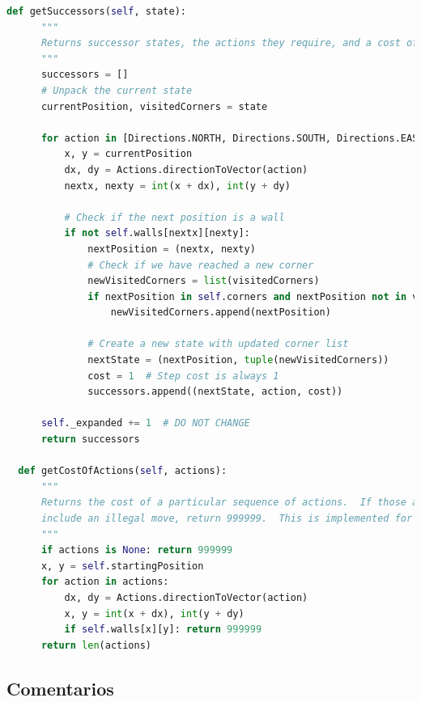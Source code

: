 \documentclass{report}
\begin{document}
\begin{lstlisting}[language=Python, caption=Implementación final del problema de las esquinas]
  def getSuccessors(self, state):
      """
      Returns successor states, the actions they require, and a cost of 1.
      """
      successors = []
      # Unpack the current state
      currentPosition, visitedCorners = state

      for action in [Directions.NORTH, Directions.SOUTH, Directions.EAST, Directions.WEST]:
          x, y = currentPosition
          dx, dy = Actions.directionToVector(action)
          nextx, nexty = int(x + dx), int(y + dy)

          # Check if the next position is a wall
          if not self.walls[nextx][nexty]:
              nextPosition = (nextx, nexty)
              # Check if we have reached a new corner
              newVisitedCorners = list(visitedCorners)
              if nextPosition in self.corners and nextPosition not in visitedCorners:
                  newVisitedCorners.append(nextPosition)

              # Create a new state with updated corner list
              nextState = (nextPosition, tuple(newVisitedCorners))
              cost = 1  # Step cost is always 1
              successors.append((nextState, action, cost))

      self._expanded += 1  # DO NOT CHANGE
      return successors

  def getCostOfActions(self, actions):
      """
      Returns the cost of a particular sequence of actions.  If those actions
      include an illegal move, return 999999.  This is implemented for you.
      """
      if actions is None: return 999999
      x, y = self.startingPosition
      for action in actions:
          dx, dy = Actions.directionToVector(action)
          x, y = int(x + dx), int(y + dy)
          if self.walls[x][y]: return 999999
      return len(actions)        
          \end{lstlisting}
        \subsection*{Comentarios}
\end{document}
